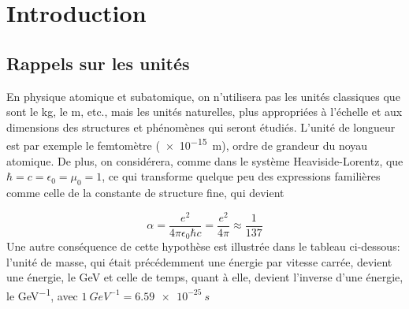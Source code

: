 \section{Introduction}
\subsection{Rappels sur les unités}
En physique atomique et subatomique, on n'utilisera pas les unités classiques que sont le \si{kg}, le \si{m}, etc., mais les unités naturelles, plus appropriées à l'échelle et aux dimensions des structures et phénomènes qui seront étudiés. L'unité de longueur est par exemple le femtomètre (\SI{e-15}{m}), ordre de grandeur du noyau atomique. De plus, on considérera, comme dans le système Heaviside-Lorentz, que  $\hbar=c=\epsilon_0=\mu_0=1$, ce qui transforme quelque peu des expressions familières comme celle de la constante de structure fine, qui devient

\[
    \alpha=\dfrac{e^2}{4\pi\epsilon_0\hbar c}=\dfrac{e^2}{4\pi}\approx\dfrac{1}{137}
\]
Une autre conséquence de cette hypothèse est illustrée dans le tableau ci-dessous: l'unité de masse, qui était précédemment une énergie par vitesse carrée,  devient une énergie, le \si{GeV} et celle de temps, quant à elle, devient l'inverse d'une énergie, le \si{GeV^{-1}}, avec $\SI{1}{GeV^{-1}}=\SI{6.59e-25}{s}$

